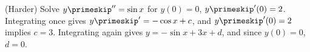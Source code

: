 {(Harder) Solve $y\primeskip'' = \sin x$ for $y(0)=0$, $y\primeskip'(0) = 2$.}
{Integrating once gives $y\primeskip' = -\cos x + c$, and $y\primeskip'(0)=2$ implies $c=3$. Integrating again gives $y=-\sin x + 3x+d$, and since $y(0)=0$, $d=0$.}